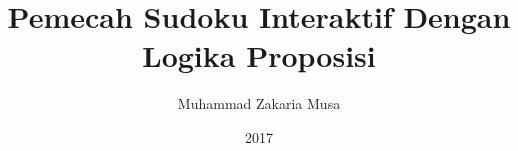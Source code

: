 \documentclass[a4paper,12pt,oneside]{book}
\title{Pemecah Sudoku Interaktif Dengan Logika Proposisi}\let\Title\@title   %
\author{Muhammad Zakaria Musa}  \let\Author\@author  %
\date{2017}           \let\Date\@date %
\newif\iflogTA
\begin{document}
\begin{titlepage}
\thispagestyle{empty}

\pagebreak
\iflogTA

\pagebreak
\fi
\thispagestyle{empty}

\pagebreak
\end{titlepage}

\iflogTA
\pagebreak
\addcontentsline{toc}{chapter}{Abstract}

\pagebreak
\addcontentsline{toc}{chapter}{Lembar Persembahan}

\pagebreak
\addcontentsline{toc}{chapter}{Kata Pengantar}

\pagebreak
\fi
\cleardoublepage
{}
\tableofcontents
\iflogTA
\newpage
\cleardoublepage
\addcontentsline{toc}{chapter}{Daftar Gambar}
\listoffigures
\newpage
\cleardoublepage
\addcontentsline{toc}{chapter}{Daftar Tabel}
\listoftables
\fi
%
\cleardoublepage
{}

%

%

%
%
%
%
%
\cleardoublepage
{}

%
\cleardoublepage
{}

\end{document}
